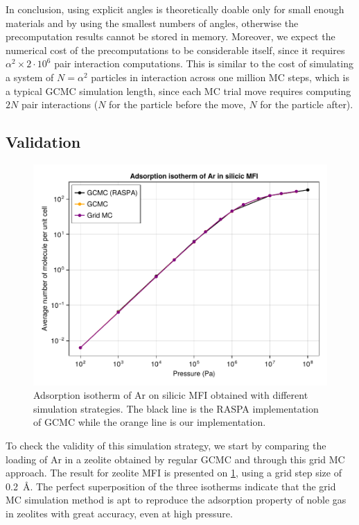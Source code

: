 \documentclass[main.tex]{subfiles}
\begin{document}
In conclusion, using explicit angles is theoretically doable only for small enough materials and by using the smallest numbers of angles, otherwise the precomputation results cannot be stored in memory. Moreover, we expect the numerical cost of the precomputations to be considerable itself, since it requires $\alpha^2\times 2\cdot10^6$ pair interaction computations. This is similar to the cost of simulating a system of $N = \alpha^2$ particles in interaction across one million MC steps, which is a typical GCMC simulation length, since each MC trial move requires computing $2N$ pair interactions ($N$ for the particle before the move, $N$ for the particle after).

\subsection{Validation}

\begin{figure}
	\centering
	\includegraphics[width=0.8\columnwidth]{figures/gcmc/gridmc_Ar_MFI.pdf}
	\caption{Adsorption isotherm of Ar on silicic MFI obtained with different simulation strategies. The black line is the RASPA implementation of GCMC while the orange line is our implementation.}\label{fig:gridMC-ArMFI}
\end{figure}

To check the validity of this simulation strategy, we start by comparing the loading of Ar in a zeolite obtained by regular GCMC and through this grid MC approach. The result for zeolite MFI is presented on \cref{fig:gridMC-ArMFI}, using a grid step size of \qty{0.2}{\angstrom}. The perfect superposition of the three isotherms indicate that the grid MC simulation method is apt to reproduce the adsorption property of noble gas in zeolites with great accuracy, even at high pressure.
\end{document}
